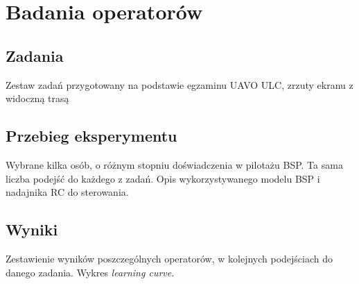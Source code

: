 \newpage
\section{Badania operatorów}

\subsection{Zadania}
\label{sec:zadania}
\begin{todo}
    Zestaw zadań przygotowany na podstawie egzaminu UAVO ULC, zrzuty ekranu z widoczną trasą
\end{todo}

\subsection{Przebieg eksperymentu}
\begin{todo}
    Wybrane kilka osób, o różnym stopniu doświadczenia w pilotażu BSP. Ta sama liczba podejść do każdego z zadań. Opis wykorzystywanego modelu BSP i nadajnika RC do sterowania.
\end{todo}

\subsection{Wyniki}
\begin{todo}
    Zestawienie wyników poszczególnych operatorów, w kolejnych podejściach do danego zadania. Wykres \emph{learning curve}.
\end{todo}